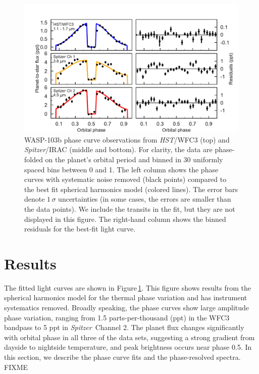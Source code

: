 \documentclass[twocolumn]{aastex61}
\newcommand{\project}[1]{\textsl{#1}}
\newcommand{\HST}{\project{HST}}
\newcommand{\Spitzer}{\project{Spitzer}}
\begin{document}
\begin{figure}
\includegraphics[width = 1.0\textwidth]{Figures/phase_curves_spherical.pdf}
\caption{WASP-103b phase curve observations from \HST/WFC3 (top) and \Spitzer/IRAC (middle and bottom). For clarity, the data are phase-folded on the planet's orbital period and binned in 30 uniformly spaced bins between 0 and 1. The left column shows the phase curves with systematic noise removed (black points) compared to the best fit spherical harmonics model (colored lines). The error bars denote $1\,\sigma$ uncertainties (in some cases, the errors are smaller than the data points).  %
We include the transits in the fit, but they are not displayed in this figure. The right-hand column shows the binned residuals for the best-fit light curve.}
\label{fig:phasecurves}
\end{figure}

\section{Results}
\label{sec:results}
The fitted light curves are shown in Figure\,\ref{fig:phasecurves}. This figure shows results from the spherical harmonics model for the thermal phase variation and has instrument systematics removed.  Broadly speaking, the phase curves show large amplitude phase variation, ranging from 1.5 parts-per-thousand (ppt) in the WFC3 bandpass to 5 ppt in \Spitzer\ Channel 2.  The planet flux changes significantly with orbital phase in all three of the data sets, suggesting a strong gradient from dayside to nightside temperature, and peak brightness occurs near phase 0.5. In this section, we describe the phase curve fits and the phase-resolved spectra. FIXME 
\end{document}
